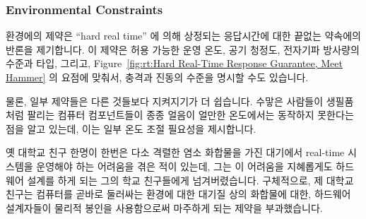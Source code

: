 \subsubsection{Environmental Constraints}
\label{sec:rt:Environmental Constraints}

환경에의 제약은 ``hard real time'' 에 의해 상정되는 응답시간에 대한 끝없는
약속에의 반론을 제기합니다.
이 제약은 허용 가능한 운영 온도, 공기 청정도, 전자기파 방사량의 수준과 타입,
그리고,
Figure~\ref{fig:rt:Hard Real-Time Response Guarantee, Meet Hammer}
의 요점에 맞춰서, 충격과 진동의 수준을 명시할 수도 있습니다.

물론, 일부 제약들은 다른 것들보다 지켜지기가 더 쉽습니다.
수맣은 사람들이 생필품처럼 팔리는 컴퓨터 컴포넌트들이 종종 얼음이 얼만한
온도에서는 동작하지 못한다는 점을 알고 있는데, 이는 일부 온도 조절 필요성을
제시합니다.

옛 대학교 친구 한명이 한번은 다소 격렬한 염소 화합물을 가진 대기에서
real-time 시스템을 운영해야 하는 어려움을 겪은 적이 있는데, 그는 이 어려움을
지혜롭게도 하드웨어 설계를 하게 되는 그의 학교 친구들에게 넘겨버렸습니다.
구체적으로, 제 대학교 친구는 컴퓨터를 곧바로 둘러싸는 환경에 대한 대기질 상의
화합물에 대한, 하드웨어 설계자들이 물리적 봉인을 사용함으로써 마주하게 되는
제약을 부과했습니다.

